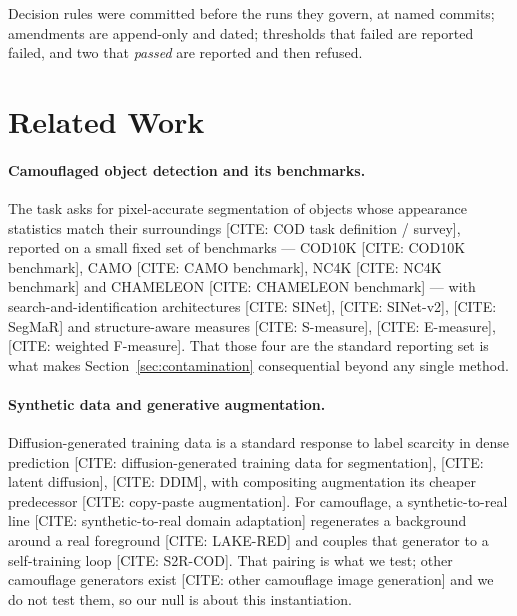 \documentclass{article} %
\begin{document}
Decision rules were committed before the runs they govern, at named commits; amendments are
append-only and dated; thresholds that failed are reported failed, and two that \emph{passed} are
reported and then refused.

\section{Related Work}
\label{sec:related}

\paragraph{Camouflaged object detection and its benchmarks.} The task asks for pixel-accurate
segmentation of objects whose appearance statistics match their surroundings
[CITE: COD task definition / survey], reported on a small fixed set of benchmarks ---
COD10K [CITE: COD10K benchmark], CAMO [CITE: CAMO benchmark], NC4K [CITE: NC4K benchmark] and
CHAMELEON [CITE: CHAMELEON benchmark] --- with search-and-identification architectures
[CITE: SINet], [CITE: SINet-v2], [CITE: SegMaR] and structure-aware measures [CITE: S-measure],
[CITE: E-measure], [CITE: weighted F-measure]. That those four are the standard reporting set is what
makes Section~\ref{sec:contamination} consequential beyond any single method.

\paragraph{Synthetic data and generative augmentation.} Diffusion-generated training data is a
standard response to label scarcity in dense prediction
[CITE: diffusion-generated training data for segmentation], [CITE: latent diffusion], [CITE: DDIM],
with compositing augmentation its cheaper predecessor [CITE: copy-paste augmentation]. For camouflage,
a synthetic-to-real line [CITE: synthetic-to-real domain adaptation] regenerates a background around a
real foreground [CITE: LAKE-RED] and couples that generator to a self-training loop [CITE: S2R-COD].
That pairing is what we test; other camouflage generators exist
[CITE: other camouflage image generation] and we do not test them, so our null is about this
instantiation.
\end{document}
